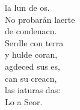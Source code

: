 \begin{cancion}
	la lun de os.\\
	\jump
	No probarán laerte \\
	de condenacn.\\
	Serdle con terra \\
	y hulde coran,\\
	agdeced sus es, \\
	can su creacn,\\
	las iaturas das:\\
	Lo a Seor.\\
	\jump
\end{cancion}%
